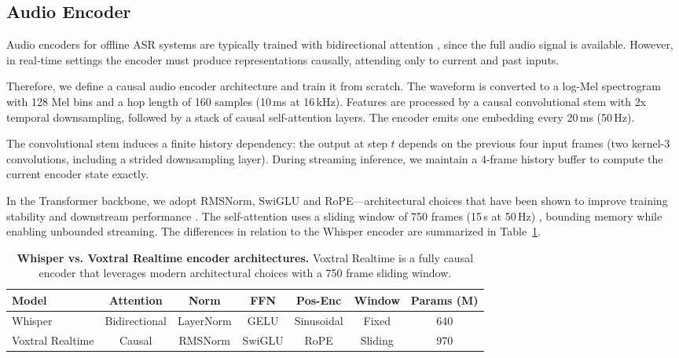 \subsection{Audio Encoder}

Audio encoders for offline ASR systems are typically trained with bidirectional attention \citep{baevski2020wav2vec20,radford2023whisper}, since the full audio signal is available. However, in real-time settings the encoder must produce representations causally, attending only to current and past inputs.

Therefore, we define a causal audio encoder architecture and train it from scratch. The waveform is converted to a log-Mel spectrogram \citep{davis1980comparison} with 128 Mel bins and a hop length of 160 samples (10\,ms at 16\,kHz). Features are processed by a causal convolutional stem with 2x temporal downsampling, followed by a stack of causal self-attention layers. The encoder emits one embedding every 20\,ms (50\,Hz).

 The convolutional stem induces a finite history dependency: the output at step $t$ depends on the previous four input frames (two kernel-3 convolutions, including a strided downsampling layer). During streaming inference, we maintain a 4-frame history buffer to compute the current encoder state exactly.

 In the Transformer backbone, we adopt RMSNorm, SwiGLU and RoPE—architectural choices that have been shown to improve training stability and downstream performance \citep{zhang2019rms,shazeer2020swiglu,su2023rope,touvron2023llama}. The self-attention uses a sliding window of 750 frames (15\,s at 50\,Hz) \citep{child2019sliding,beltagy2020long}, bounding memory while enabling unbounded streaming. The differences in relation to the Whisper encoder are summarized in Table~\ref{tab:archi}.

\begin{table}[t]
\centering
\caption{\textbf{Whisper vs. Voxtral Realtime encoder architectures.} Voxtral Realtime is a fully causal encoder that leverages modern architectural choices with a 750 frame sliding window.}
\label{tab:archi}
\begin{tabular}{lcccccc}
\toprule
\textbf{Model}   & \textbf{Attention} & \textbf{Norm} & \textbf{FFN} & \textbf{Pos-Enc} & \textbf{Window} & \textbf{Params (M)}      \\
\midrule
Whisper & Bidirectional & LayerNorm & GELU     & Sinusoidal  & Fixed & 640 \\
Voxtral Realtime  & Causal  & RMSNorm   & SwiGLU   & RoPE   & Sliding  & 970      \\
\bottomrule
\end{tabular}
\end{table}

